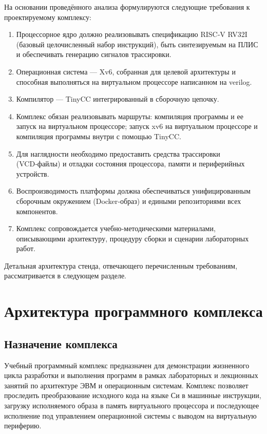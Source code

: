 На основании проведённого анализа формулируются следующие требования к проектируемому комплексу:

\begin{enumerate}
  \item Процессорное ядро должно реализовывать спецификацию RISC‑V RV32I (базовый целочисленный набор инструкций), быть синтезируемым на ПЛИС и обеспечивать генерацию сигналов трассировки.
  \item Операционная система — Xv6, собранная для целевой архитектуры и способная выполняться на виртуальном процессоре написанном на verilog.
  \item Компилятор — TinyCC интегрированный в сборочную цепочку.
  \item Комплекс обязан реализовывать маршруты: компиляция программы и ее запуск на виртуальном процессоре; запуск xv6 на виртуальном процессоре и компиляция программы внутри с помощью TinyCC.
  \item Для наглядности необходимо предоставить средства трассировки (VCD‑файлы) и отладки состояния процессора, памяти и периферийных устройств.
  \item Воспроизводимость платформы должна обеспечиваться унифицированным сборочным окружением (Docker‑образ) и едиными репозиториями всех компонентов.
  \item Комплекс сопровождается учебно‑методическими материалами, описывающими архитектуру, процедуру сборки и сценарии лабораторных работ.
\end{enumerate}

Детальная архитектура стенда, отвечающего перечисленным требованиям, рассматривается в следующем разделе.


\section{Архитектура программного комплекса}

\subsection{Назначение комплекса}

Учебный программный комплекс предназначен для демонстрации жизненного цикла разработки и выполнения программ в рамках лабораторных и лекционных занятий по архитектуре ЭВМ и операционным системам. Комплекс позволяет проследить преобразование исходного кода на языке Си в машинные инструкции, загрузку исполняемого образа в память виртуального процессора и последующее исполнение под управлением операционной системы с выводом на виртуальную периферию.

